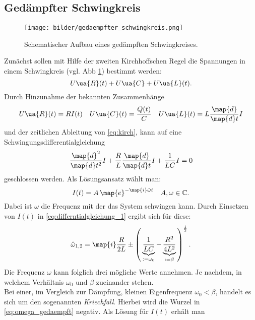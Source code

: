 \subsection{Gedämpfter Schwingkreis}
\begin{figure}
  \centering
  \texttt{[image: bilder/gedaempfter\_schwingkreis.png]}
  \caption{Schematischer Aufbau eines gedämpften Schwingkreises\cite{anleitung354}. }
  \label{fig:gedaempft}
  \end{figure}
Zunächst sollen mit Hilfe der zweiten %
Kirchhoffschen Regel die Spannungen in einem Schwingkreis (vgl. Abb \ref{fig:gedaempft}) %
bestimmt werden:
\begin{equation}
  \label{eq:kirch}
U\ua{R}(t)+U\ua{C}+U\ua{L}(t).
\end{equation}
Durch Hinzunahme der bekannten Zusammenhänge %
\begin{equation*}
U\ua{R}(t)=RI(t) \quad U\ua{C}(t)=\frac{Q(t)}{C} \quad U\ua{L}(t)=L\frac{\map{d}}{\map{d}t}I
\end{equation*}
und der zeitlichen Ableitung von \eqref{eq:kirch}, kann auf eine Schwingungsdifferentialgleichung %
\begin{equation}
  \label{eq:differntialgleichung_1}
\frac{\map{d}^2}{\map{d}t^2}I+\frac{R}{L}\frac{\map{d}}{\map{d}t}I+\frac{1}{LC}I=0
\end{equation}
geschlossen werden.
Als Lösungsansatz wählt man:
\begin{equation*}
  I(t)=A\,\map{e}^{-\map{i}\hat{\omega} t} \quad A,\omega\in\mathbb{C}.
\end{equation*}
Dabei ist $\omega$ die Frequenz mit der das System schwingen kann.
Durch Einsetzen von $I(t)$ in \eqref{eq:differntialgleichung_1} ergibt sich %
für diese:
\begin{equation}
  \label{eq:omega_gedaempft}
  \hat{\omega}_{1,2}=\map{i}\frac{R}{2L}\pm\left(\,\underbrace{\frac{1}{LC}}_{:=\omega_0}-\underbrace{\frac{R^2}{4L^2}}_{:=\beta}\,\right)^{\frac{1}{2}}.
\end{equation}
 Die Frequenz $\omega$ kann folglich drei mögliche Werte annehmen.
 Je nachdem, in welchem Verhältnis $\omega_0$ und $\beta$ zueinander stehen.  %
\\
Bei einer, im Vergleich zur Dämpfung, kleinen Eigenfrequenz $\omega_0<\beta$,
handelt es sich um den sogenannten \emph{Kriechfall}. %
Hierbei wird die Wurzel in \eqref{eq:omega_gedaempft} negativ. Als Lösung für
$I(t)$ erhält man

